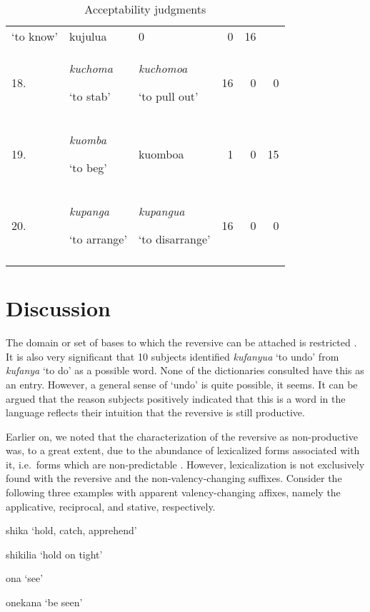 \documentclass[output=paper]{langsci/langscibook}
\begin{document}
\begin{table}
\begin{tabularx}{\textwidth}{lp{2cm}Xrrr}
 ‘to know’ & kujulua &  0 &  0 &  16\\
 18. & \textit{kuchoma}

 ‘to stab’ & \textit{kuchomoa}

 ‘to pull out’ &  16 &  0 &  0\\
 19. & \textit{kuomba}

 ‘to beg’ &  kuomboa &  1 &  0 &  15\\
 20. &  \textit{kupanga}   

 ‘to arrange’ & \textit{kupangua}

 ‘to disarrange’ &  16 &  0 &  0\\
\lspbottomrule 
\end{tabularx}
\caption{Acceptability judgments}
\label{tab:ngonyaningowa:4}
\end{table}


\newpage 
\section{Discussion}\label{sec:ngonyaningowa:5}

The domain or set of bases to which the reversive can be attached is restricted \citep{HaspelmathSims2010}. It is also very significant that 10 subjects identified \textit{kufanyua} ‘to undo’ from \textit{kufanya} ‘to do’ as a possible word. None of the dictionaries consulted have this as an entry. However, a general sense of ‘undo’ is quite possible, it seems. It can be argued that the reason subjects positively indicated that this is a word in the language reflects their intuition that the reversive is still productive. 

Earlier on, we noted that the characterization of the reversive as non-productive was, to a great extent, due to the abundance of lexicalized forms associated with it, i.e.\ forms which are non-predictable \citep{Shepardson1986}. However, lexicalization is not exclusively found with the reversive and the non-valency-changing suffixes. Consider the following three examples with apparent valency-changing affixes, namely the applicative, reciprocal, and stative, respectively. 

\ea\label{ex:ngonyaningowa:11}
\ea\label{ex:ngonyaningowa:11a}
{shika} ‘hold, catch, apprehend’

\ex\label{ex:ngonyaningowa:11b} 
shikilia  ‘hold on tight’
\z
\z 

\ea\label{ex:ngonyaningowa:12}
\ea\label{ex:ngonyaningowa:12a}
ona ‘see’

\ex\label{ex:ngonyaningowa:12b}  
onekana  ‘be seen’
\z 
\z 
\end{document}
